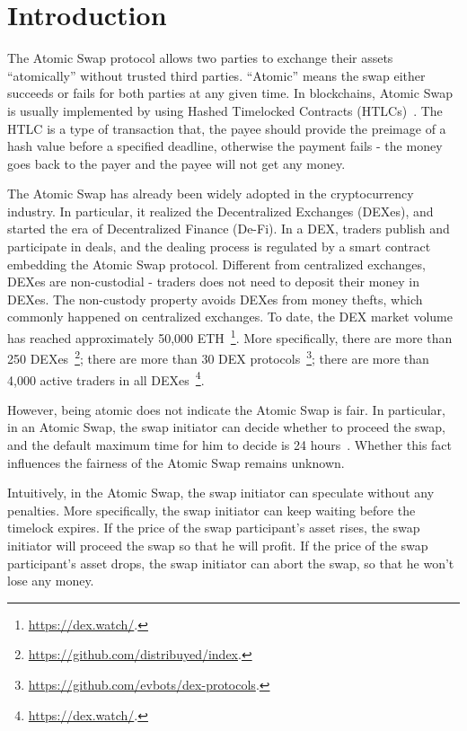 \section{Introduction}
\label{sec:intro}

The Atomic Swap protocol allows two parties to exchange their assets ``atomically'' without trusted third parties.
``Atomic'' means the swap either succeeds or fails for both parties at any given time.
In blockchains, Atomic Swap is usually implemented by using Hashed Timelocked Contracts (HTLCs)~\cite{decker2015fast}.
The HTLC is a type of transaction that, the payee should provide the preimage of a hash value before a specified deadline, otherwise the payment fails - the money goes back to the payer and the payee will not get any money.

The Atomic Swap has already been widely adopted in the cryptocurrency industry.
In particular, it realized the Decentralized Exchanges (DEXes), and started the era of Decentralized Finance (De-Fi).
In a DEX, traders publish and participate in deals, and the dealing process is regulated by a smart contract embedding the Atomic Swap protocol.
Different from centralized exchanges, DEXes are non-custodial - traders does not need to deposit their money in DEXes.
The non-custody property avoids DEXes from money thefts, which commonly happened on centralized exchanges.
To date, the DEX market volume has reached approximately 50,000 ETH~\footnote{\url{https://dex.watch/}.}.
More specifically,
there are more than 250 DEXes~\footnote{\url{https://github.com/distribuyed/index}.};
there are more than 30 DEX protocols~\footnote{\url{https://github.com/evbots/dex-protocols}.};
there are more than 4,000 active traders in all DEXes~\footnote{\url{https://dex.watch/}.}.



However, being atomic does not indicate the Atomic Swap is fair.
In particular, in an Atomic Swap, the swap initiator can decide whether to proceed the swap, and the default maximum time for him to decide is 24 hours~\cite{nolan2013alt}.
Whether this fact influences the fairness of the Atomic Swap remains unknown.


Intuitively, in the Atomic Swap, the swap initiator can speculate without any penalties.
More specifically, the swap initiator can keep waiting before the timelock expires.
If the price of the swap participant's asset rises, the swap initiator will proceed the swap so that he will profit.
If the price of the swap participant's asset drops, the swap initiator can abort the swap, so that he won't lose any money.

